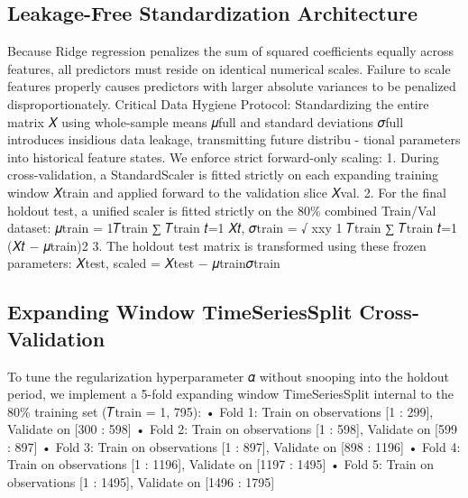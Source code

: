 \documentclass[12pt, a4paper]{article}
\begin{document}
\subsection{Leakage-Free Standardization Architecture}
Because Ridge regression penalizes the sum of squared coefficients equally across features, all predictors 
must reside on identical numerical scales. Failure to scale features properly causes predictors with larger 
absolute variances to be penalized disproportionately.
Critical Data Hygiene Protocol: Standardizing the entire matrix 𝑋 using whole-sample means 
𝜇full and standard deviations 𝜎full introduces insidious data leakage, transmitting future distribu -
tional parameters into historical feature states.
We enforce strict forward-only scaling:
1. During cross-validation, a StandardScaler is fitted strictly on each expanding training window 
𝑋train and applied forward to the validation slice 𝑋val.
2. For the final holdout test, a unified scaler is fitted strictly on the 80\% combined Train/Val 
dataset:
𝜇train = 1𝑇train ∑
𝑇train
𝑡=1
𝑋𝑡, 𝜎train =
√
xxy 1
𝑇train
∑
𝑇train
𝑡=1
(𝑋𝑡 − 𝜇train)2
3. The holdout test matrix is transformed using these frozen parameters:
𝑋test, scaled = 𝑋test − 𝜇train𝜎train

\subsection{Expanding Window TimeSeriesSplit Cross-Validation}
To tune the regularization hyperparameter 𝛼 without snooping into the holdout period, we implement a 
5-fold expanding window TimeSeriesSplit internal to the 80\% training set (𝑇train = 1, 795):
• Fold 1: Train on observations [1 : 299], Validate on [300 : 598]
• Fold 2: Train on observations [1 : 598], Validate on [599 : 897]
• Fold 3: Train on observations [1 : 897], Validate on [898 : 1196]
• Fold 4: Train on observations [1 : 1196], Validate on [1197 : 1495]
• Fold 5: Train on observations [1 : 1495], Validate on [1496 : 1795]
\end{document}
